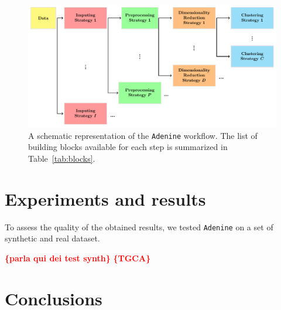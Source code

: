 \documentclass[twoside,11pt]{article}
\makeatletter
\newcommand{\ade}{\texttt{Adenine}\@\xspace}
\newcommand{\todo}[1]{\textcolor{red}{{\bf \{#1\}}}} %
\makeatother
\begin{document}
\begin{figure}[h!]
    \centering
    \includegraphics[width=\textwidth]{ade_wf/ade_wf.pdf}
    \caption{A schematic representation of the \ade workflow. The list of building blocks available for each step is summarized in Table~\ref{tab:blocks}.}\label{fig:workflow}
\end{figure}


\section{Experiments and results}
To assess the quality of the obtained results, we tested \ade on a set of synthetic and real dataset.

\todo{parla qui dei test synth}
\todo{TGCA}

\section{Conclusions}



\end{document}
